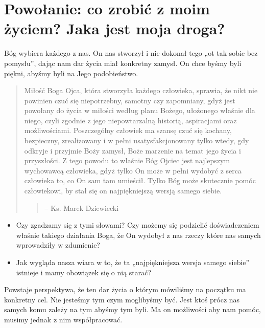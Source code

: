 \documentclass[a5paper,10pt,polish]{book}
\begin{document}
\section{Powołanie:  co zrobić z moim życiem? Jaka jest moja droga?}
\label{miliardowice-2005-jesien/spotkanie1:powolanie-co-zrobic-z-moim-zyciem-jaka-jest-moja-droga}
Bóg wybiera każdego z nas. On nas stworzył i nie dokonał tego „ot tak sobie bez pomysłu”, dając nam dar życia miał konkretny zamysł. On chce byśmy byli piękni, abyśmy byli na Jego podobieństwo.
\begin{quote}

Miłość Boga Ojca, która stworzyła każdego człowieka, sprawia, że  nikt nie powinien czuć się niepotrzebny, samotny czy zapomniany, gdyż jest powołany do życia w miłości  według  planu Bożego, ułożonego właśnie dla niego, czyli zgodnie  z jego niepowtarzalną historią, aspiracjami oraz możliwościami. Poszczególny człowiek ma szansę czuć się kochany, bezpieczny, zrealizowany i w pełni usatysfakcjonowany tylko wtedy, gdy odkryje i przyjmie Boży zamysł, Boże marzenie na temat jego życia i przyszłości. Z tego powodu to właśnie Bóg Ojciec jest najlepszym wychowawcą człowieka,  gdyż tylko On może w pełni wydobyć z serca człowieka to, co On sam tam umieścił. Tylko Bóg może skutecznie pomóc człowiekowi, by stał się on najpiękniejszą wersją samego siebie.
\begin{quote}

--  Ks. Marek Dziewiecki
\end{quote}
\end{quote}
\begin{itemize}
\item {} 
Czy zgadzamy  się z tymi słowami? Czy możemy  się podzielić doświadczeniem właśnie takiego działania Boga, że On wydobył z nas rzeczy które nas samych wprowadziły w zdumienie?

\item {} 
Jak wygląda nasza wiara w to, że ta „najpiękniejsza wersja samego siebie” istnieje i mamy obowiązek  się o nią starać?

\end{itemize}

Powstaje perspektywa, że ten dar życia o którym mówiliśmy na początku ma konkretny cel. Nie jesteśmy tym czym moglibyśmy być. Jest ktoś prócz nas samych komu zależy na tym abyśmy tym byli. Ma on możliwości aby nam pomóc, musimy jednak z nim współpracować.
\end{document}
